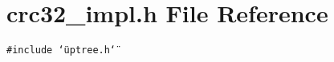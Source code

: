 \section{crc32\_\-impl.h File Reference}
\label{crc32__impl_8h}
{\tt \#include \char`\"{}uptree.h\char`\"{}}\par
